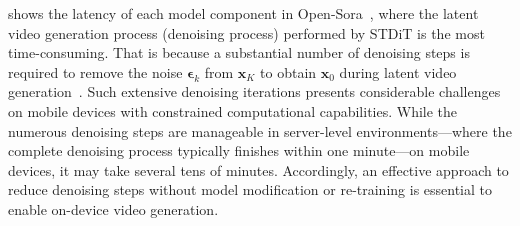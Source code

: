  shows the latency of each model component in Open-Sora~\cite{opensora}, where the latent video generation process (denoising process) performed by STDiT is the most time-consuming. %
That is because a substantial number of denoising steps  %
is required to remove the noise $\boldsymbol{\epsilon}_{k}$ from $\mathbf{x}_{K}$ to obtain $\mathbf{x}_{0}$ during latent video generation~\cite{song2020denoising}. Such extensive denoising iterations %
presents considerable challenges on mobile devices with constrained computational capabilities. %
While the numerous denoising steps are manageable in server-level environments—where the complete denoising process typically finishes within one minute—on mobile devices, it may take several tens of minutes. %
Accordingly, an effective approach to reduce denoising steps without model modification or re-training %
is essential to enable on-device video generation.

